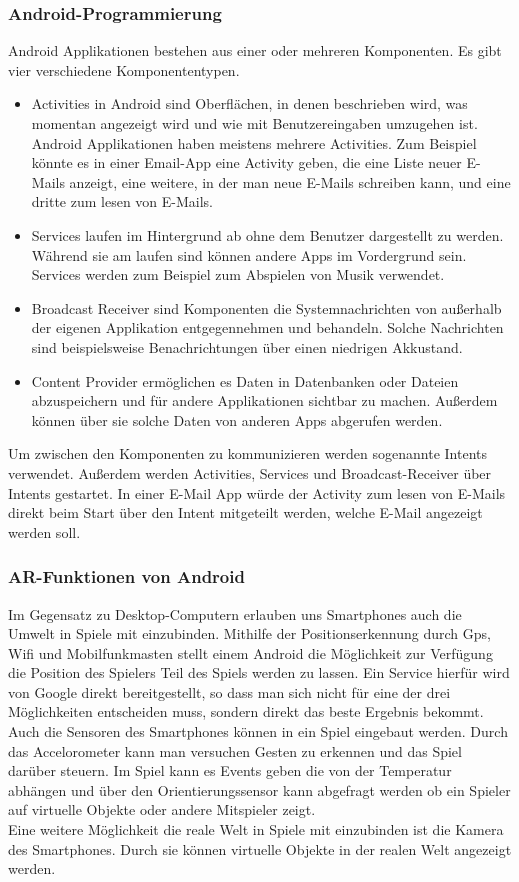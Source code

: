 \documentclass[extern,palatino]{cgBA}
\begin{document}
	\subsubsection{Android-Programmierung}Android Applikationen bestehen aus einer oder  mehreren Komponenten. Es gibt vier verschiedene Komponententypen.
	\begin{itemize}
		\item 
		Activities in Android sind Oberflächen, in denen beschrieben wird, was momentan angezeigt wird und wie mit Benutzereingaben umzugehen ist. Android Applikationen haben meistens mehrere Activities. Zum Beispiel könnte es in einer Email-App eine Activity geben, die eine Liste neuer E-Mails anzeigt, eine weitere, in der man neue E-Mails schreiben kann, und eine dritte zum lesen von E-Mails. 
		\item
		Services laufen im Hintergrund ab ohne dem Benutzer dargestellt zu werden. Während sie am laufen sind können andere Apps im Vordergrund sein. Services werden zum Beispiel zum  Abspielen von Musik verwendet.
		\item Broadcast Receiver sind Komponenten die Systemnachrichten von außerhalb der eigenen Applikation entgegennehmen und behandeln. Solche Nachrichten sind beispielsweise Benachrichtungen über einen niedrigen Akkustand.
		\item Content Provider ermöglichen es Daten in Datenbanken oder Dateien abzuspeichern und für andere Applikationen sichtbar zu machen. Außerdem können über sie solche Daten von anderen Apps abgerufen werden.
	\end{itemize}
	Um zwischen den Komponenten zu kommunizieren werden sogenannte Intents verwendet.  Außerdem werden Activities, Services und Broadcast-Receiver über Intents gestartet. In einer E-Mail App würde der Activity zum lesen von E-Mails direkt beim Start über den Intent mitgeteilt werden, welche E-Mail angezeigt werden soll.
	\subsubsection{AR-Funktionen von Android}
	Im Gegensatz zu Desktop-Computern erlauben uns Smartphones auch die Umwelt in Spiele mit einzubinden. Mithilfe der Positionserkennung durch Gps, Wifi und Mobilfunkmasten stellt einem Android die Möglichkeit zur Verfügung die Position des Spielers Teil des Spiels werden zu lassen. Ein Service hierfür wird von Google direkt bereitgestellt, so dass man sich nicht für eine der drei Möglichkeiten entscheiden muss, sondern direkt das beste Ergebnis bekommt.\\
	Auch die Sensoren des Smartphones können in ein Spiel eingebaut werden. Durch das Accelorometer kann man versuchen Gesten zu erkennen und das Spiel darüber steuern. Im Spiel kann es Events geben die von der Temperatur abhängen und über den Orientierungssensor kann abgefragt werden ob ein Spieler auf virtuelle Objekte oder andere Mitspieler zeigt.\\
	Eine weitere Möglichkeit die reale Welt in Spiele mit einzubinden ist die Kamera des Smartphones. Durch sie können virtuelle Objekte in der realen Welt angezeigt werden. 
	\newpage
\end{document}

